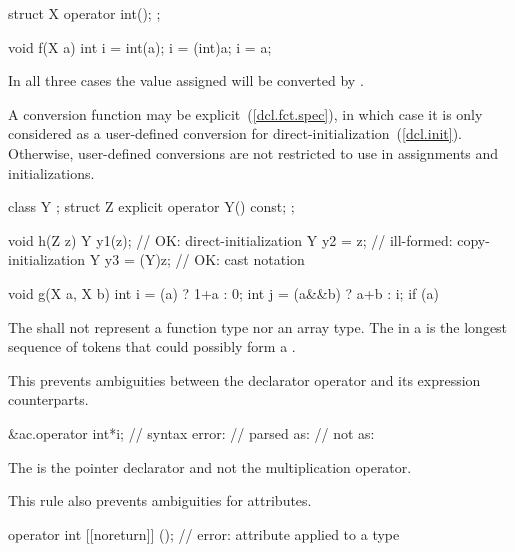 \begin{example}

\begin{codeblock}
struct X {
  operator int();
};

void f(X a) {
  int i = int(a);
  i = (int)a;
  i = a;
}
\end{codeblock}

In all three cases the value assigned will be converted by
.
\end{example}

\pnum
A conversion function may be explicit~(\ref{dcl.fct.spec}), in which case it is only considered as a user-defined conversion for direct-initialization~(\ref{dcl.init}). Otherwise, user-defined conversions are not restricted to use in assignments and initializations.
\begin{example}

\begin{codeblock}
class Y { };
struct Z {
  explicit operator Y() const;
};

void h(Z z) {
  Y y1(z);          // OK: direct-initialization
  Y y2 = z;         // ill-formed: copy-initialization
  Y y3 = (Y)z;      // OK: cast notation
}

void g(X a, X b) {
  int i = (a) ? 1+a : 0;
  int j = (a&&b) ? a+b : i;
  if (a) {
  }
}
\end{codeblock}
\end{example}

\pnum
The
shall not represent a function type nor an array type.
The
in a
is the longest sequence of
tokens that could possibly form a .
\begin{note}
This prevents ambiguities between the declarator operator \tcode{*} and its expression
counterparts.
\begin{example}

\begin{codeblock}
&ac.operator int*i; // syntax error:
                    // parsed as: 
                    // not as: 
\end{codeblock}

The \tcode{*} is the pointer declarator and not the multiplication operator.
\end{example}

This rule also prevents ambiguities for attributes. 
\begin{example}
\begin{codeblock}
operator int [[noreturn]] (); // error:  attribute applied to a type
\end{codeblock}
\end{example}
\end{note}

